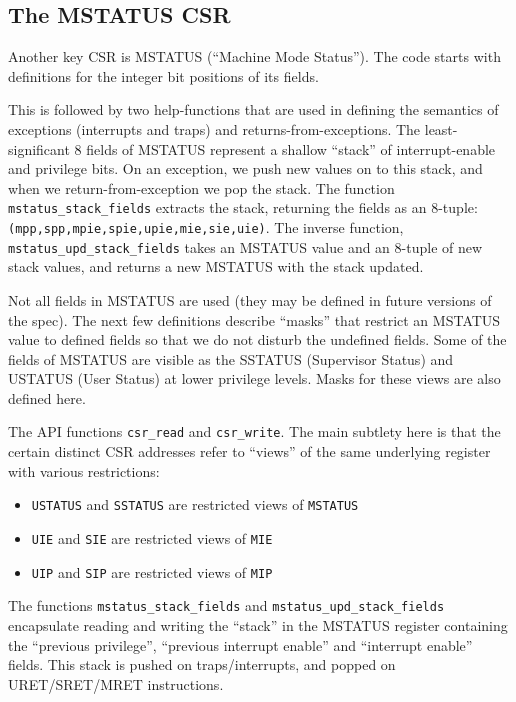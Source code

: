 \documentclass[11pt]{article}
\begin{document}
\subsection{The MSTATUS CSR}

Another key CSR is MSTATUS (``Machine Mode Status'').  The code starts
with definitions for the integer bit positions of its fields.

This is followed by two help-functions that are used in defining the
semantics of exceptions (interrupts and traps) and
returns-from-exceptions.  The least-significant 8 fields of MSTATUS
represent a shallow ``stack'' of interrupt-enable and privilege
bits. On an exception, we push new values on to this stack, and when
we return-from-exception we pop the stack. The function
\verb|mstatus_stack_fields| extracts the stack, returning the fields
as an 8-tuple: \verb|(mpp,spp,mpie,spie,upie,mie,sie,uie)|.  The
inverse function, \verb|mstatus_upd_stack_fields| takes an MSTATUS
value and an 8-tuple of new stack values, and returns a new MSTATUS
with the stack updated.

Not all fields in MSTATUS are used (they may be defined in future
versions of the spec).  The next few definitions describe ``masks''
that restrict an MSTATUS value to defined fields so that we do not
disturb the undefined fields.  Some of the fields of MSTATUS are
visible as the SSTATUS (Supervisor Status) and USTATUS (User Status)
at lower privilege levels.  Masks for these views are also defined
here.

The API functions \verb|csr_read| and \verb|csr_write|.  The main
subtlety here is that the certain distinct CSR addresses refer to
``views'' of the same underlying register with various restrictions:

\begin{itemize}
\item
\verb|USTATUS| and \verb|SSTATUS| are restricted views of \verb|MSTATUS|

\item
\verb|UIE| and \verb|SIE| are restricted views of \verb|MIE|

\item
\verb|UIP| and \verb|SIP| are restricted views of \verb|MIP|
\end{itemize}


The functions \verb|mstatus_stack_fields| and
\verb|mstatus_upd_stack_fields| encapsulate reading and writing the
``stack'' in the MSTATUS register containing the ``previous
privilege'', ``previous interrupt enable'' and ``interrupt enable''
fields.  This stack is pushed on traps/interrupts, and popped on
URET/SRET/MRET instructions.
\end{document}
